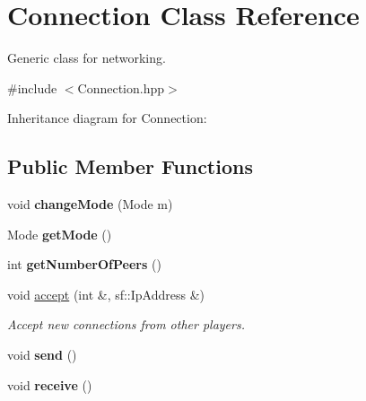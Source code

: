 \hypertarget{class_connection}{\section{Connection Class Reference}
\label{class_connection}
}


Generic class for networking.  




{\ttfamily \#include $<$Connection.\+hpp$>$}



Inheritance diagram for Connection\+:
\subsection*{Public Member Functions}
\begin{DoxyCompactItemize}
\item 
\hypertarget{class_connection_a0f7808de4ae1a64556ad49935a026f89}{void {\bfseries change\+Mode} (Mode m)}\label{class_connection_a0f7808de4ae1a64556ad49935a026f89}

\item 
\hypertarget{class_connection_aa960efc27b883b2bb46816026beae838}{Mode {\bfseries get\+Mode} ()}\label{class_connection_aa960efc27b883b2bb46816026beae838}

\item 
\hypertarget{class_connection_a3678c5190e941d61672fba99686ad2b0}{int {\bfseries get\+Number\+Of\+Peers} ()}\label{class_connection_a3678c5190e941d61672fba99686ad2b0}

\item 
\hypertarget{class_connection_ae4c8fcac97cd2848e4006d2310184806}{void \hyperlink{class_connection_ae4c8fcac97cd2848e4006d2310184806}{accept} (int \&, sf\+::\+Ip\+Address \&)}\label{class_connection_ae4c8fcac97cd2848e4006d2310184806}

\begin{DoxyCompactList}\small\item\em Accept new connections from other players. \end{DoxyCompactList}\item 
\hypertarget{class_connection_ab355a816174eb028f7addecc688a39b1}{void {\bfseries send} ()}\label{class_connection_ab355a816174eb028f7addecc688a39b1}

\item 
\hypertarget{class_connection_a87270f6cb729edcb5577616d28bc563f}{void {\bfseries receive} ()}\label{class_connection_a87270f6cb729edcb5577616d28bc563f}


\end{DoxyCompactItemize}
